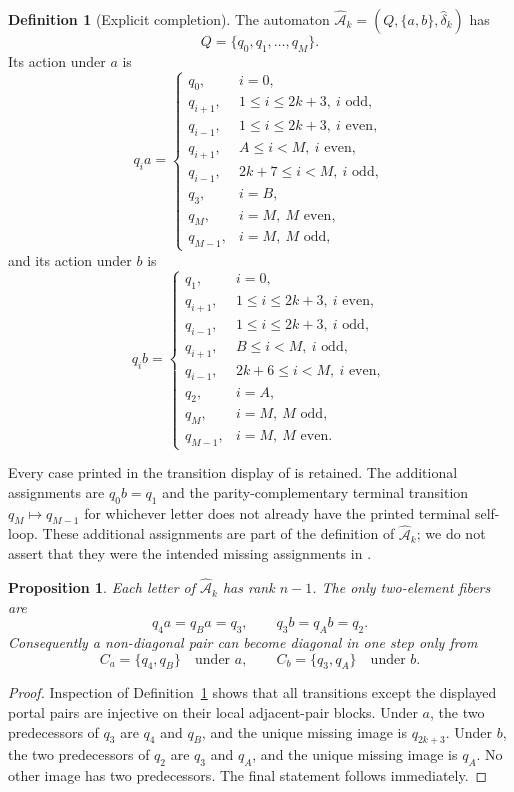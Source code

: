 \documentclass[11pt]{article}
\newtheorem{proposition}{Proposition}
\theoremstyle{definition}
\newtheorem{definition}{Definition}
\theoremstyle{remark}
\newcommand{\Ahat}{\widehat{\mathcal A}}
\newcommand{\pair}[2]{\{q_{#1},q_{#2}\}}
\begin{document}
\begin{definition}[Explicit completion]\label{def:completion}
The automaton $\Ahat_k=(Q,\{a,b\},\widehat\delta_k)$ has
\[
 Q=\{q_0,q_1,\ldots,q_M\}.
\]
Its action under $a$ is
\[
q_i a=
\begin{cases}
q_0,&i=0,\\
q_{i+1},&1\le i\le 2k+3,\ i\text{ odd},\\
q_{i-1},&1\le i\le 2k+3,\ i\text{ even},\\
q_{i+1},&A\le i<M,\ i\text{ even},\\
q_{i-1},&2k+7\le i<M,\ i\text{ odd},\\
q_3,&i=B,\\
q_M,&i=M,\ M\text{ even},\\
q_{M-1},&i=M,\ M\text{ odd},
\end{cases}
\]
and its action under $b$ is
\[
q_i b=
\begin{cases}
q_1,&i=0,\\
q_{i+1},&1\le i\le 2k+3,\ i\text{ even},\\
q_{i-1},&1\le i\le 2k+3,\ i\text{ odd},\\
q_{i+1},&B\le i<M,\ i\text{ odd},\\
q_{i-1},&2k+6\le i<M,\ i\text{ even},\\
q_2,&i=A,\\
q_M,&i=M,\ M\text{ odd},\\
q_{M-1},&i=M,\ M\text{ even}.
\end{cases}
\]
\end{definition}

Every case printed in the transition display of \cite[Sec.~2.3]{Szykula2026} is retained. The additional assignments are $q_0b=q_1$ and the parity-complementary terminal transition $q_M\mapsto q_{M-1}$ for whichever letter does not already have the printed terminal self-loop. These additional assignments are part of the definition of $\Ahat_k$; we do not assert that they were the intended missing assignments in \cite{Szykula2026,Dzyga2018}.

\begin{proposition}\label{prop:rank}
Each letter of $\Ahat_k$ has rank $n-1$. The only two-element fibers are
\[
 q_4a=q_Ba=q_3,
 \qquad
 q_3b=q_Ab=q_2.
\]
Consequently a non-diagonal pair can become diagonal in one step only from
\[
 C_a=\pair{4}{B}\quad\text{under }a,
 \qquad
 C_b=\pair{3}{A}\quad\text{under }b.
\]
\end{proposition}

\begin{proof}
Inspection of Definition~\ref{def:completion} shows that all transitions except the displayed portal pairs are injective on their local adjacent-pair blocks. Under $a$, the two predecessors of $q_3$ are $q_4$ and $q_B$, and the unique missing image is $q_{2k+3}$. Under $b$, the two predecessors of $q_2$ are $q_3$ and $q_A$, and the unique missing image is $q_A$. No other image has two predecessors. The final statement follows immediately.
\end{proof}
\end{document}
